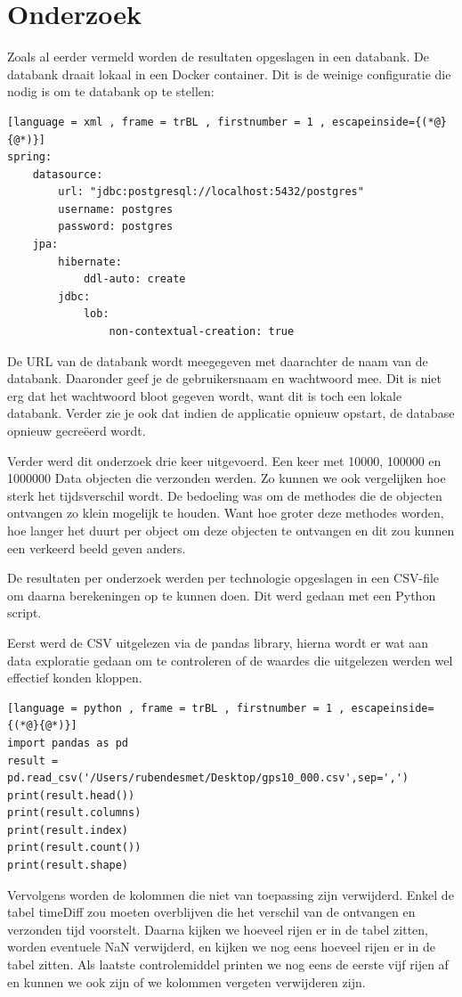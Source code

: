 \section{Onderzoek}
Zoals al eerder vermeld worden de resultaten opgeslagen in een databank. De databank draait lokaal in een Docker container. Dit is de weinige configuratie die nodig is om te databank op te stellen:
\begin{lstlisting}[language = xml , frame = trBL , firstnumber = 1 , escapeinside={(*@}{@*)}]
spring:
    datasource:
        url: "jdbc:postgresql://localhost:5432/postgres"
        username: postgres
        password: postgres
    jpa:
        hibernate:
            ddl-auto: create
        jdbc:
            lob:
                non-contextual-creation: true
\end{lstlisting}
De URL van de databank wordt meegegeven met daarachter de naam van de databank. Daaronder geef je de gebruikersnaam en wachtwoord mee. Dit is niet erg dat het wachtwoord bloot gegeven wordt, want dit is toch een lokale databank. Verder zie je ook dat indien de applicatie opnieuw opstart, de database opnieuw gecreëerd wordt.

Verder werd dit onderzoek drie keer uitgevoerd. Een keer met 10000, 100000 en 1000000 Data objecten die verzonden werden. Zo kunnen we ook vergelijken hoe sterk het tijdsverschil wordt. De bedoeling was om de methodes die de objecten ontvangen zo klein mogelijk te houden. Want hoe groter deze methodes worden, hoe langer het duurt per object om deze objecten te ontvangen en dit zou kunnen een verkeerd beeld geven anders.

De resultaten per onderzoek werden per technologie opgeslagen in een CSV-file om daarna berekeningen op te kunnen doen. Dit werd gedaan met een Python script. 

Eerst werd de CSV uitgelezen via de pandas library, hierna wordt er wat aan data exploratie gedaan om te controleren of de waardes die uitgelezen werden wel effectief konden kloppen. 
\begin{lstlisting}[language = python , frame = trBL , firstnumber = 1 , escapeinside={(*@}{@*)}]
import pandas as pd
result = pd.read_csv('/Users/rubendesmet/Desktop/gps10_000.csv',sep=',')
print(result.head())
print(result.columns)
print(result.index)
print(result.count())
print(result.shape)
\end{lstlisting}

Vervolgens worden de kolommen die niet van toepassing zijn verwijderd. Enkel de tabel timeDiff zou moeten overblijven die het verschil van de ontvangen en verzonden tijd voorstelt. Daarna kijken we hoeveel rijen er in de tabel zitten, worden eventuele NaN verwijderd, en kijken we nog eens hoeveel rijen er in de tabel zitten. Als laatste controlemiddel printen we nog eens de eerste vijf rijen af en kunnen we ook zijn of we kolommen vergeten verwijderen zijn. 

